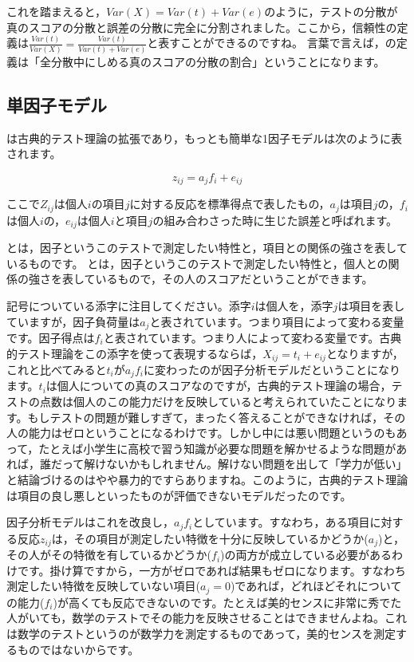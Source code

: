 \documentclass{ltjsbook}
\begin{document}
これを踏まえると，$Var(X)=Var(t)+Var(e)$のように，テストの分散が真のスコアの分散と誤差の分散に完全に分割されました。ここから，信頼性の定義は$\frac{Var(t)}{Var(X)}=\frac{Var(t)}{Var(t)+Var(e)}$と表すことができるのですね。
言葉で言えば，の定義は「全分散中にしめる真のスコアの分散の割合」ということになります。
\subsection{単因子モデル}
は古典的テスト理論の拡張であり，もっとも簡単な1因子モデルは次のように表されます。

\[ z_{ij} = a_j f_i + e_{ij} \]

ここで$Z_{ij}$は個人$i$の項目$j$に対する反応を標準得点で表したもの，$a_j$は項目$j$の，$f_i$は個人$i$の，$e_{ij}$は個人$i$と項目$j$の組み合わさった時に生じた誤差と呼ばれます。

とは，因子というこのテストで測定したい特性と，項目との関係の強さを表しているものです。
とは，因子というこのテストで測定したい特性と，個人との関係の強さを表しているもので，その人のスコアだということができます。

記号についている添字に注目してください。添字$i$は個人を，添字$j$は項目を表していますが，因子負荷量は$a_j$と表されています。つまり項目によって変わる変量です。因子得点は$f_i$と表されています。つまり人によって変わる変量です。古典的テスト理論をこの添字を使って表現するならば，$X_{ij} = t_i + e_{ij}$となりますが，これと比べてみると$t_i$が$a_jf_i$に変わったのが因子分析モデルだということになります。$t_i$は個人についての真のスコアなのですが，古典的テスト理論の場合，テストの点数は個人のこの能力だけを反映していると考えられていたことになります。もしテストの問題が難しすぎて，まったく答えることができなければ，その人の能力はゼロということになるわけです。しかし中には悪い問題というのもあって，たとえば小学生に高校で習う知識が必要な問題を解かせるような問題があれば，誰だって解けないかもしれません。解けない問題を出して「学力が低い」と結論づけるのはやや暴力的ですらありますね。このように，古典的テスト理論は項目の良し悪しといったものが評価できないモデルだったのです。

因子分析モデルはこれを改良し，$a_j f_i$としています。すなわち，ある項目に対する反応$z_{ij}$は，その項目が測定したい特徴を十分に反映しているかどうか($a_j$)と，その人がその特徴を有しているかどうか($f_i$)の両方が成立している必要があるわけです。掛け算ですから，一方がゼロであれば結果もゼロになります。すなわち測定したい特徴を反映していない項目($a_j=0$)であれば，どれほどそれについての能力($f_i$)が高くても反応できないのです。たとえば美的センスに非常に秀でた人がいても，数学のテストでその能力を反映させることはできませんよね。これは数学のテストというのが数学力を測定するものであって，美的センスを測定するものではないからです。
\end{document}
